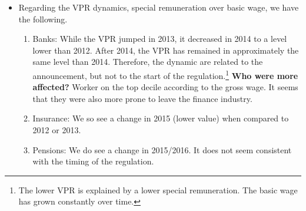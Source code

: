 \documentclass[12pt]{article}
\begin{document}
	\begin{itemize}
		\item Regarding the VPR dynamics, special remuneration over basic wage, we have the following. 
		\begin{enumerate}
			\item Banks: While the VPR jumped in 2013, it decreased in 2014 to a level lower than 2012. After 2014, the VPR has remained in approximately the same level than 2014. Therefore, the dynamic are related to the announcement, but not to the start of the regulation.\footnote{The lower VPR is explained by a lower special remuneration. The basic wage has grown constantly over time. } \textbf{Who were more affected?}  Worker on the top decile according to the gross wage. It seems that they were also more prone to leave the finance industry. 
			\item Insurance: We so see a change in 2015 (lower value) when compared to 2012 or 2013.
			\item Pensions: We do see a change in 2015/2016. It does not seem consistent with the timing of the regulation.  
			

\end{enumerate}
\end{itemize}
\end{document}
